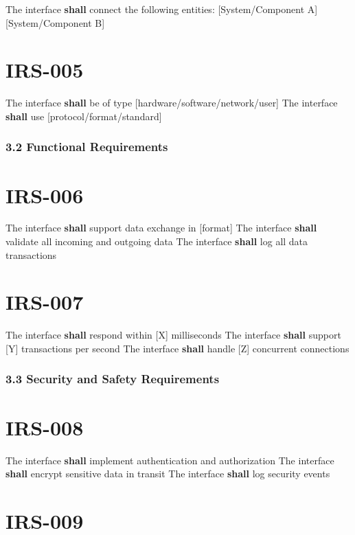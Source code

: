 The interface \textbf{shall} connect the following entities:
[System/Component A]
[System/Component B]

\section{IRS-005}\label{IRS-005}

The interface \textbf{shall} be of type [hardware/software/network/user]
The interface \textbf{shall} use [protocol/format/standard]

\subsubsection{3.2 Functional Requirements}

\section{IRS-006}\label{IRS-006}

The interface \textbf{shall} support data exchange in [format]
The interface \textbf{shall} validate all incoming and outgoing data
The interface \textbf{shall} log all data transactions

\section{IRS-007}\label{IRS-007}

The interface \textbf{shall} respond within [X] milliseconds
The interface \textbf{shall} support [Y] transactions per second
The interface \textbf{shall} handle [Z] concurrent connections

\subsubsection{3.3 Security and Safety Requirements}

\section{IRS-008}\label{IRS-008}

The interface \textbf{shall} implement authentication and authorization
The interface \textbf{shall} encrypt sensitive data in transit
The interface \textbf{shall} log security events

\section{IRS-009}\label{IRS-009}

